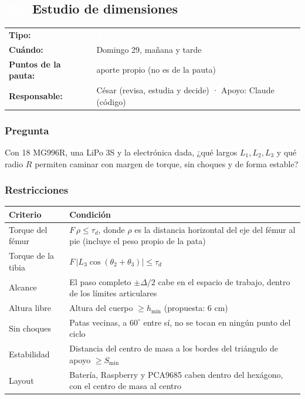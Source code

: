 \documentclass[11pt,a4paper]{article}
\makeatletter
\newcommand{\pill}[2]{{\setlength{\fboxsep}{1.6pt}\colorbox{#1}{\textcolor{white}{\footnotesize\bfseries\,#2\,}}}}
\newcommand{\Eo}{\pill{cEstudio}{E8}}
\newcommand{\ficha}[4]{%
  \begin{tabularx}{\linewidth}{@{}l Y@{}}
  \textbf{Tipo:} & \pill{#1}{#2}\\
  \textbf{Cuándo:} & #3\\
  \textbf{Puntos de la pauta:} & #4\\
  \textbf{Responsable:} & César (revisa, estudia y decide) · Apoyo: Claude (código)\\
  \end{tabularx}\par}
\makeatother
\begin{document}
\subsection{\texorpdfstring{\Eo\ }{E8 }Estudio de dimensiones}
\ficha{cEstudio}{Estudio}{Domingo 29, mañana y tarde}{aporte propio (no es de la pauta)}

\subsubsection{Pregunta}
Con 18 MG996R, una LiPo 3S y la electrónica dada, ¿qué largos $L_1, L_2, L_3$ y qué radio $R$ permiten caminar con margen de torque, sin choques y de forma estable?

\subsubsection{Restricciones}
\begin{tabularx}{\linewidth}{@{}l Y@{}}
\toprule \textbf{Criterio} & \textbf{Condición}\\ \midrule
Torque del fémur & $F\,\rho \leq \tau_d$, donde $\rho$ es la distancia horizontal del eje del fémur al pie (incluye el peso propio de la pata)\\
Torque de la tibia & $F\,|L_3\cos(\theta_2+\theta_3)| \leq \tau_d$\\
Alcance & El paso completo $\pm\Delta/2$ cabe en el espacio de trabajo, dentro de los límites articulares\\
Altura libre & Altura del cuerpo $\geq h_{\min}$ (propuesta: 6 cm)\\
Sin choques & Patas vecinas, a $60^\circ$ entre sí, no se tocan en ningún punto del ciclo\\
Estabilidad & Distancia del centro de masa a los bordes del triángulo de apoyo $\geq S_{\min}$\\
Layout & Batería, Raspberry y PCA9685 caben dentro del hexágono, con el centro de masa al centro\\
\bottomrule
\end{tabularx}
\end{document}
